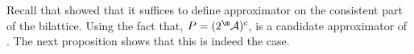 Recall that \citet{DeneckerMT04} showed that it suffices to define approximator on the consistent part of the bilattice. 
Using the fact that, $P=(2^\acts)^c$, \Ap is a candidate approximator of \Op. The next proposition shows that this is indeed the case. 


% 

